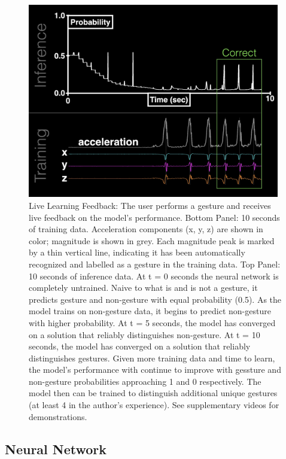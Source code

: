 \documentclass{nime-alternate} %
\begin{document}
\begin{figure}[h]
    \centering
    \includegraphics[width=0.98\textwidth]{../figures/realtime_training.jpg}
    \caption{Live Learning Feedback: The user performs a gesture and receives live feedback on the model's performance. Bottom Panel: 10 seconds of training data. Acceleration components (x, y, z) are shown in color; magnitude is shown in grey. Each magnitude peak is marked by a thin vertical line, indicating it has been automatically recognized and labelled as a gesture in the training data. Top Panel: 10 seconds of inference data. At t = 0 seconds the neural network is completely untrained. Naive to what is and is not a gesture, it predicts gesture and non-gesture with equal probability (0.5). As the model trains on non-gesture data, it begins to predict non-gesture with higher probability. At t = 5 seconds, the model has converged on a solution that reliably distinguishes non-gesture. At t = 10 seconds, the model has converged on a solution that reliably distinguishes gestures. Given more training data and time to learn, the model's performance with continue to improve with gessture and non-gesture probabilities approaching 1 and 0 respectively. The model then can be trained to distinguish additional unique gestures (at least 4 in the author's experience). See supplementary videos for demonstrations.}
    \label{fig:realtime_training}
\end{figure}

\subsection{Neural Network}
\end{document}
